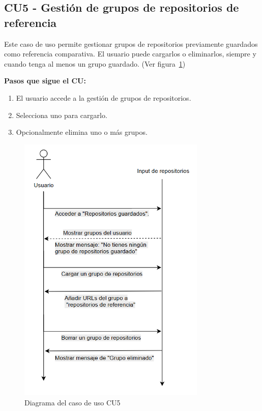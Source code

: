 \subsection*{CU5 - Gestión de grupos de repositorios de referencia}

Este caso de uso permite gestionar grupos de repositorios previamente guardados como referencia comparativa. El usuario puede cargarlos o eliminarlos, siempre y cuando tenga al menos un grupo guardado. (Ver figura~\ref{fig:DiagramaCU5})

\textbf{Pasos que sigue el CU:}
\begin{enumerate}
  \item El usuario accede a la gestión de grupos de repositorios.
  \item Selecciona uno para cargarlo.
  \item Opcionalmente elimina uno o más grupos.
\end{enumerate}

\begin{figure}[H]
\centering
\includegraphics[width=0.8\textwidth]{img/DiagramaCU5.png}
\caption{Diagrama del caso de uso CU5}
\label{fig:DiagramaCU5}
\end{figure}

